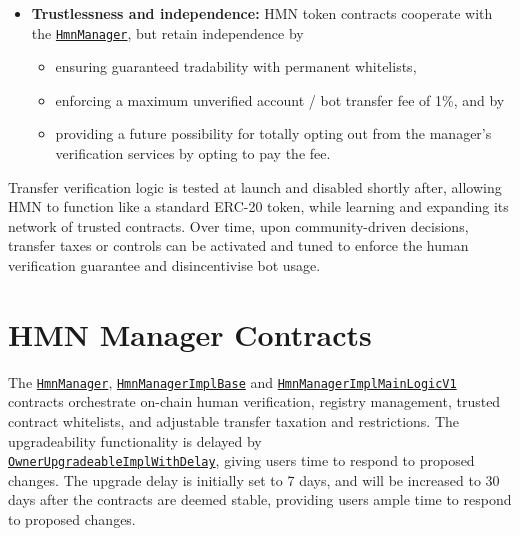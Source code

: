 \documentclass[12pt,a4paper]{article}
\begin{document}
\begin{itemize}
\begin{itemize}
          \end{itemize}
    \item \textbf{Trustlessness and independence:} HMN token contracts cooperate with the \texttt{\href{https://github.com/hmn-is/hmn-contracts/blob/main/src/HmnManager.sol}{HmnManager}}, but retain independence by
          \begin{itemize}
            \item ensuring guaranteed tradability with permanent whitelists,
            \item enforcing a maximum unverified account / bot transfer fee of 1\%, and by
            \item providing a future possibility for totally opting out from the manager's verification services by opting to pay the fee.
          \end{itemize}
\end{itemize}

Transfer verification logic is tested at launch and disabled shortly after, allowing HMN to function like a standard ERC-20 token, while learning and expanding its network of trusted contracts.
Over time, upon community-driven decisions, transfer taxes or controls can be activated and tuned to enforce the human verification guarantee and disincentivise bot usage.

\section{HMN Manager Contracts}
The \texttt{\href{https://github.com/hmn-is/hmn-contracts/blob/main/src/HmnManager.sol}{HmnManager}}, \texttt{\href{https://github.com/hmn-is/hmn-contracts/blob/main/src/HmnManagerImplBase.sol}{HmnManagerImplBase}} and \texttt{\href{https://github.com/hmn-is/hmn-contracts/blob/main/src/HmnManagerImplMainLogicV1.sol}{HmnManagerImplMainLogicV1}}
contracts orchestrate on-chain human verification, registry management, trusted contract whitelists, and adjustable transfer taxation and restrictions.
The upgradeability functionality is delayed by\\\texttt{\href{https://github.com/hmn-is/hmn-contracts/blob/main/src/abstract/OwnerUpgradeableImplWithDelay.sol}{OwnerUpgradeableImplWithDelay}}, giving users time to respond to proposed changes.
The upgrade delay is initially set to 7 days, and will be increased to 30 days after the contracts are deemed stable, providing users ample time to respond to proposed changes.
\end{document}
